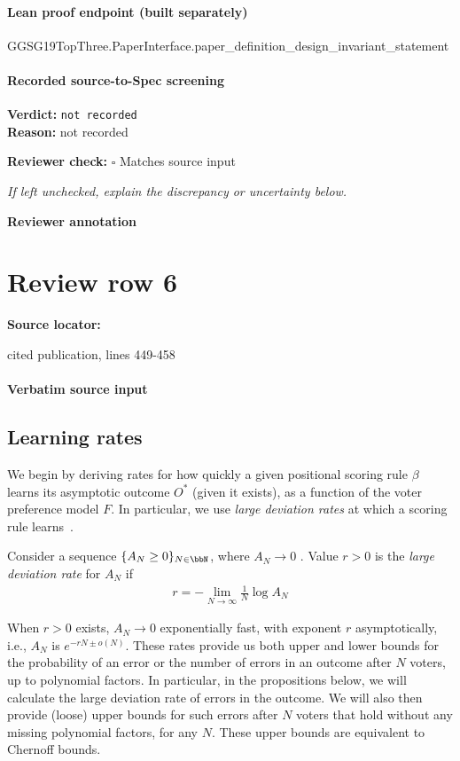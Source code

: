 \documentclass[10pt]{article}
\newcommand{\reviewerbox}{%
  \par\noindent\fbox{\parbox{0.96\linewidth}{\rule{0pt}{0.38in}}}\par
}
\newcommand{\reviewmatch}[1]{%
  \par\noindent\textbf{Reviewer check:} $\square$\; #1\par
  \noindent\emph{If left unchecked, explain the discrepancy or uncertainty below.}\par
}
\begin{document}
\paragraph{Lean proof endpoint (built separately)}\begin{ReviewVerbatim}
GGSG19TopThree.PaperInterface.paper_definition_design_invariant_statement
\end{ReviewVerbatim}

\paragraph{Recorded source-to-Spec screening}
\textbf{Verdict:} \texttt{not recorded}
\\
\textbf{Reason:} not recorded
\reviewmatch{Matches source input}
\noindent\textbf{Reviewer annotation}\par
\reviewerbox
\clearpage
\hypertarget{source-claim-c61b482940640a59}{}
\section*{Review row 6}
\textbf{Source locator:} {\footnotesize\raggedright cited publication, lines 449-\allowbreak{}458\par}
\paragraph{Verbatim source input}
\begin{ReviewVerbatim}
\subsection{Learning rates}

We begin by deriving rates for how quickly a given positional scoring rule $\beta$ learns its asymptotic outcome $O^*$ (given it exists), as a function of the voter preference model $F$. %
In particular, we use \textit{large deviation rates} at which a scoring rule learns~\cite{dembo_large_2010}.
\begin{definition}
	Consider a sequence $\{A_N \geq 0\}_{N \in \bbN}$, where $A_N \to 0$ . Value $r>0$ is the \textit{large deviation rate} for $A_N$ if
	\begin{align*}
	r = -\lim_{N\to\infty}\frac{1}{N} \log A_N
	\end{align*}
\end{definition} When $r>0$ exists, $A_N \to 0$ exponentially fast, with exponent $r$ asymptotically, i.e., $A_N$ is $e^{-rN \pm o(N)}$. These rates provide us both upper and lower bounds for the probability of an error or the number of errors in an outcome after $N$ voters, up to polynomial factors. In particular, in the propositions below, we will calculate the large deviation rate of errors in the outcome. We will also then provide (loose) upper bounds for such errors after $N$ voters that hold without any missing polynomial factors, for any $N$. These upper bounds are equivalent to Chernoff bounds.
\end{ReviewVerbatim}
\end{document}
